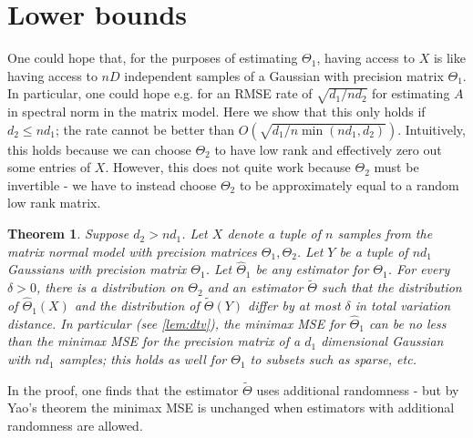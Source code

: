 \documentclass[aos]{imsart}
\newtheorem{theorem}{Theorem}
\theoremstyle{definition}
\newcommand{\CF}[1]{{\color{purple}[CF: #1]}}
\begin{document}
\section{Lower bounds}
One could hope that, for the purposes of estimating $\Theta_1$, having access to $X$ is like having access to $n D$ independent samples of a Gaussian with precision matrix $\Theta_1$. In particular, one could hope e.g. for an RMSE rate of $\sqrt{ d_1/ n d_2}$ for estimating $A$ in spectral norm in the matrix model. Here we show that this only holds if $d_2 \leq n d_1$; the rate cannot be better than $O(\sqrt{d_1/ n \min(n d_1, d_2)})$. Intuitively, this holds because we can choose $\Theta_2$ to have low rank and effectively zero out some entries of $X$. However, this does not quite work because $\Theta_2$ must be invertible - we have to instead choose $\Theta_2$ to be approximately equal to a random low rank matrix.

\begin{theorem}Suppose $d_2 > n d_1$. Let $X$ denote a tuple of $n$ samples from the matrix normal model with precision matrices $\Theta_1, \Theta_2$. Let $Y$ be a tuple of $nd_1$ Gaussians with precision matrix $\Theta_1$. Let $\hat{\Theta}_1$ be any estimator for $\Theta_1$. For every $\delta > 0$, there is a distribution on $\Theta_2$ and an estimator $\tilde{\Theta}$ such that the distribution of $\hat{\Theta}_1(X)$ and the distribution of $\tilde{\Theta}(Y)$ differ by at most $\delta$ in total variation distance. In particular (see \cref{lem:dtv}), the minimax MSE for $\widehat{\Theta}_1$ can be no less than the minimax MSE for the precision matrix of a $d_1$ dimensional Gaussian with $nd_1$ samples; this holds as well for $\Theta_1$ to subsets such as sparse, etc. %
\end{theorem}
In the proof, one finds that the estimator $\tilde{\Theta}$ uses additional randomness - but by Yao's theorem the minimax MSE is unchanged when estimators with additional randomness are allowed.
\end{document}
